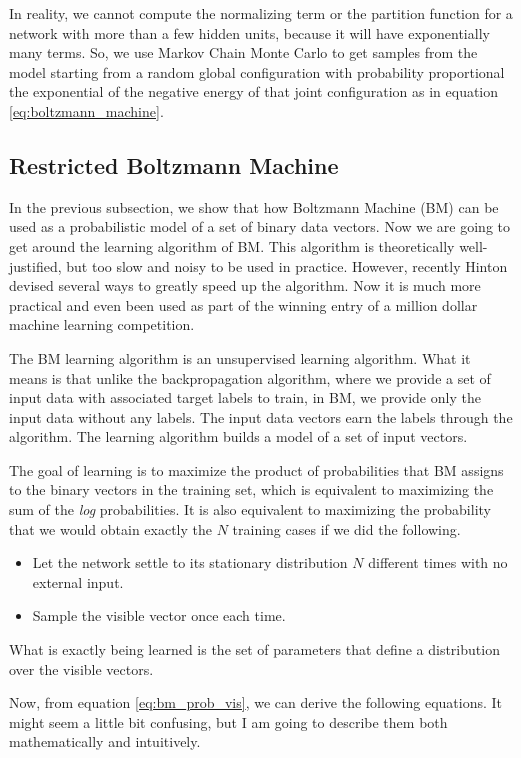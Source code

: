 \documentclass{article}
\begin{document}
In reality, we cannot compute the normalizing term or the partition function for a network with more than a few hidden units, because it will have exponentially many terms. So, we use Markov Chain Monte Carlo to get samples from the model starting from a random global configuration with probability proportional the exponential of the negative energy of that joint configuration as in equation \ref{eq:boltzmann_machine}.

\subsection{Restricted Boltzmann Machine}
In the previous subsection, we show that how Boltzmann Machine (BM) can be used as a probabilistic model of a set of binary data vectors. Now we are going to get around the learning algorithm of BM. This algorithm is theoretically well-justified, but too slow and noisy to be used in practice. However, recently Hinton devised several ways to greatly speed up the algorithm. Now it is much more practical and even been used as part of the winning entry of a million dollar machine learning competition. 

The BM learning algorithm is an unsupervised learning algorithm. What it means is that unlike the backpropagation algorithm, where we provide a set of input data with associated target labels to train, in BM, we provide only the input data without any labels. The input data vectors earn the labels through the algorithm. The learning algorithm builds a model of a set of input vectors.

The goal of learning is to maximize the product of probabilities that BM assigns to the binary vectors in the training set, which is equivalent to maximizing the sum of the \textit{log} probabilities. It is also equivalent to maximizing the probability that we would obtain exactly the $N$ training cases if we did the following.

\begin{itemize}
	\item Let the network settle to its stationary distribution $N$ different times with no external input.
	\item Sample the visible vector once each time.
\end{itemize}

What is exactly being learned is the set of parameters that define a distribution over the visible vectors.

Now, from equation \ref{eq:bm_prob_vis}, we can derive the following equations. It might seem a little bit confusing, but I am going to describe them both mathematically and intuitively.
\end{document}
